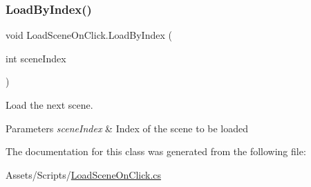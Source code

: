 \subsubsection{\texorpdfstring{LoadByIndex()}{LoadByIndex()}}
{\footnotesize\ttfamily void Load\+Scene\+On\+Click.\+Load\+By\+Index (\begin{DoxyParamCaption}\item[{int}]{scene\+Index }\end{DoxyParamCaption})}



Load the next scene. 


\begin{DoxyParams}{Parameters}
{\em scene\+Index} & Index of the scene to be loaded \\
\hline
\end{DoxyParams}


The documentation for this class was generated from the following file\+:\begin{DoxyCompactItemize}
\item 
Assets/\+Scripts/\mbox{\hyperlink{_load_scene_on_click_8cs}{Load\+Scene\+On\+Click.\+cs}}\end{DoxyCompactItemize}
